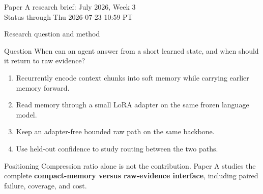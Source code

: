 
\begin{frame}
  \titlepage
  \vspace{-1.0em}
  \begin{center}
    \small Paper A research brief: July 2026, Week 3 \\
    \scriptsize Status through Thu 2026-07-23 10:59 PT
  \end{center}
\end{frame}

\begin{frame}{Research question and method}
  \begin{block}{Question}
    When can an agent answer from a short learned state, and when should it return to raw evidence?
  \end{block}
  \begin{enumerate}\small
    \item Recurrently encode context chunks into soft memory while carrying earlier memory forward.
    \item Read memory through a small LoRA adapter on the same frozen language model.
    \item Keep an adapter-free bounded raw path on the same backbone.
    \item Use held-out confidence to study routing between the two paths.
  \end{enumerate}
  \begin{block}{Positioning}
    \footnotesize Compression ratio alone is not the contribution. Paper A studies the complete
    \textbf{compact-memory versus raw-evidence interface}, including paired failure, coverage, and cost.
  \end{block}
\end{frame}

